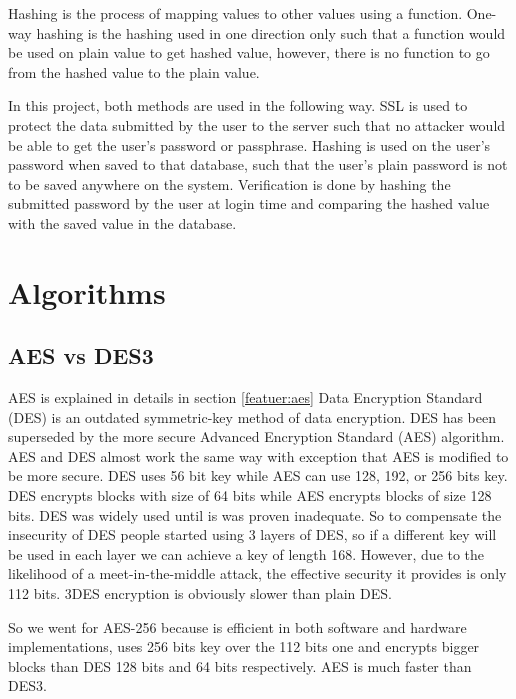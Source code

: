 Hashing is the process of mapping values to other values using a function. One-way hashing is the hashing used in one direction only such that a function would be used on plain value to get hashed value, however, there is no function to go from the hashed value to the plain value.

In this project, both methods are used in the following way. SSL is used to protect the data submitted by the user to the server such that no attacker would be able to get the user's password or passphrase. Hashing is used on the user's password when saved to that database, such that the user's plain password is not to be saved anywhere on the system. Verification is done by hashing the submitted password by the user at login time and comparing the hashed value with the saved value in the database.

\section{Algorithms}

\subsection{AES vs DES3}
AES is explained in details in section \ref{featuer:aes}
Data Encryption Standard (DES) is an outdated symmetric-key method of data encryption. DES has been superseded by the more secure Advanced Encryption Standard (AES) algorithm. AES and DES almost work the same way with exception that AES is modified to be more secure. DES uses 56 bit key while AES can use 128, 192, or 256 bits key. DES encrypts blocks with size of 64 bits while AES encrypts blocks of size 128 bits. DES was widely used until is was proven inadequate. So to compensate the insecurity of DES people started using 3 layers of DES, so if a different key will be used in each layer we can achieve a key of length 168. However, due to the likelihood of a meet-in-the-middle attack, the effective security it provides is only 112 bits. 3DES encryption is obviously slower than plain DES.
\par So we went for AES-256 because is efficient in both software and hardware implementations, uses 256 bits key over the 112 bits one and encrypts bigger blocks than DES 128 bits and 64 bits respectively. AES is much faster than DES3.

